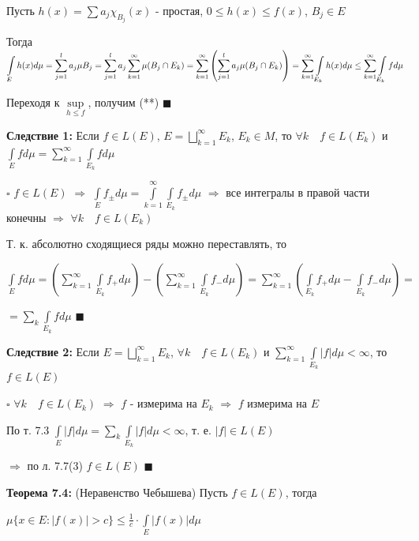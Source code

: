 \documentclass[a4paper]{report}
\newcommand*{\hm}[1]{#1\nobreak\discretionary{}%
            {\hbox{$\mathsurround=0pt #1$}}{}}
\begin{document}
Пусть $h(x)=\sum a_j\chi_{B_j}(x)$ - простая, $0\le h(x)\le f(x)$, $B_j\in E$


Тогда $\displaystyle\int\limits_E h(x) d\mu=\sum\limits_{j=1}^l a_j\mu B_j=\sum\limits_{j=1}^l a_j\sum\limits_{k=1}^\infty\mu(B_j\cap E_k)=\sum\limits_{k=1}^\infty\left(
\sum\limits_{j=1}^l a_j\mu(B_j\cap E_k)\right)\hm=\sum\limits_{k=1}^\infty\displaystyle\int\limits_{E_k}h(x) d\mu\le\sum\limits_{k=1}^\infty\displaystyle\int\limits_{E_k} fd\mu$

Переходя к $\sup\limits_{h\le f}$, получим (**) $\blacksquare$
\bigskip

\noindent\textbf{Следствие 1:} Если $f\in L(E)$, $E=\bigsqcup\limits_{k=1}^\infty E_k$, $E_k\in M$, то $\forall k\quad f\in L(E_k)$ и $\displaystyle\int\limits_Efd\mu=\sum\limits_{k=1}^\infty\displaystyle\int\limits_{E_k}fd\mu$

\noindent $\square$ $f\in L(E)$ $\Rightarrow$ $\displaystyle\int\limits_E f_\pm d\mu=\displaystyle\int\limits_{k=1}^\infty\displaystyle\int\limits_{E_k}f_\pm d\mu$ $\Rightarrow$ все интегралы в правой части конечны $\Rightarrow$ $\forall k\quad f\in L(E_k)$

Т. к. абсолютно сходящиеся ряды можно переставлять, то

$\displaystyle\int\limits_E fd\mu=\left(\sum\limits_{k=1}^\infty\displaystyle\int\limits_{E_k} f_+d\mu\right)-\left(\sum\limits_{k=1}^\infty\displaystyle\int\limits_{E_k} f_-d\mu\right)=\sum\limits_{k=1}^\infty\left(\displaystyle\int\limits_{E_k}f_+d\mu-\displaystyle\int\limits_{E_k}f_-d\mu\right)=$

\noindent $=\sum\limits_k\displaystyle\int\limits_{E_k} fd\mu$ $\blacksquare$
\bigskip

\noindent\textbf{Следствие 2:} Если $E=\bigsqcup\limits_{k=1}^\infty E_k$, $\forall k\quad f\in L(E_k)$ и $\sum\limits_{k=1}^\infty\displaystyle\int\limits_{E_k}|f|d\mu<\infty$,
 то $f\in L(E)$

\noindent $\square$ $\forall k\quad f\in L(E_k)$ $\Rightarrow$ $f$ - измерима на $E_k$ $\Rightarrow$ $f$ измерима на $E$

По т. 7.3 $\displaystyle\int\limits_E|f|d\mu=\sum\limits_k\displaystyle\int\limits_{E_k}|f|d\mu<\infty$, т. е. $|f|\in L(E)$

$\Rightarrow$ по л. 7.7(3) $f\in L(E)$ $\blacksquare$
\bigskip

\noindent\textbf{Теорема 7.4:} (Неравенство Чебышева) Пусть $f\in L(E)$, тогда

$\mu\{x\in E\colon|f(x)|>c\}\le\frac1c\cdot\displaystyle\int\limits_E|f(x)|d\mu$
\end{document}
